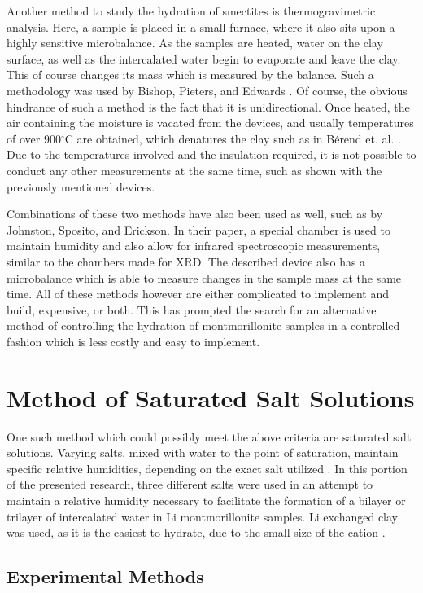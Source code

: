 Another method to study the hydration of smectites is thermogravimetric analysis. Here, a sample is placed in a small furnace, where it also sits upon a highly sensitive microbalance. As the samples are heated, water on the clay surface, as well as the intercalated water begin to evaporate and leave the clay. This of course changes its mass which is measured by the balance. Such a methodology was used by Bishop, Pieters, and Edwards \cite{bishop1994infrared}. Of course, the obvious hindrance of such a method is the fact that it is unidirectional. Once heated, the air containing the moisture is vacated from the devices, and usually temperatures of over 900$^\circ$C are obtained, which denatures the clay such as in Bérend et. al. \cite{berend1995mechanism}. Due to the temperatures involved and the insulation required, it is not possible to conduct any other measurements at the same time, such as shown with the previously mentioned devices.

Combinations of these two methods have also been used as well, such as by Johnston, Sposito, and Erickson. In their paper, a special chamber is used to maintain humidity and also allow for infrared spectroscopic measurements, similar to the chambers made for XRD. The described device also has a microbalance which is able to measure changes in the sample mass at the same time. All of these methods however are either complicated to implement and build, expensive, or both. This has prompted the search for an alternative method of controlling the hydration of montmorillonite samples in a controlled fashion which is less costly and easy to implement.

\section{Method of Saturated Salt Solutions}
One such method which could possibly meet the above criteria are saturated salt solutions. Varying salts, mixed with water to the point of saturation, maintain specific relative humidities, depending on the exact salt utilized \cite{young1967humidity}. In this portion of the presented research, three different salts were used in an attempt to maintain a relative humidity necessary to facilitate the formation of a bilayer or trilayer of intercalated water in Li montmorillonite samples. Li exchanged clay was used, as it is the easiest to hydrate, due to the small size of the cation \cite{mering1964gonflement}.

\subsection{Experimental Methods}

